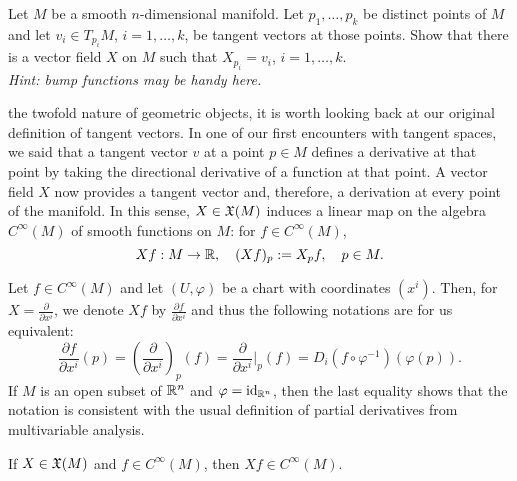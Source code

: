 \begin{exercise}
  Let $M$ be a smooth $n$-dimensional manifold.
  Let $p_1,\ldots,p_k$ be distinct points of $M$ and let $v_i\in T_{p_i}M$, $i=1,\ldots,k$, be tangent vectors at those points.
  Show that there is a vector field $X$ on $M$ such that $X_{p_i} = v_i$, $i=1,\ldots, k$.\\
  \textit{\small Hint: bump functions may be handy here.}
\end{exercise}

 the twofold nature of geometric objects, it is worth looking back at our original definition of tangent vectors.
In one of our first encounters with tangent spaces, we said that a tangent vector $v$ at a point $p\in M$ defines a derivative at that point by taking the directional derivative of a function at that point.
A vector field $X$ now provides a tangent vector and, therefore, a derivation at every point of the manifold.
In this sense, $X\in\mathfrak{X}(M)$ induces a linear map on the algebra $C^\infty(M)$ of smooth functions on $M$: for $f\in C^\infty(M)$,
\begin{equation}\label{eq:diff_directional_derivative}
  Xf : M\to\mathbb{R}, \quad
  (Xf)_p := X_p f, \quad p\in M.
\end{equation}

\begin{notation}\label{notation:derivative}
  Let $f\in C^\infty(M)$ and let $(U, \varphi)$ be a chart with coordinates $(x^i)$.
  Then, for $X = \frac{\partial}{\partial x^i}$, we denote $Xf$ by $\frac{\partial f}{\partial x^i}$ and thus the following notations are for us equivalent:
  \begin{equation}
    \frac{\partial f}{\partial x^i}(p)
    = \left(\frac{\partial}{\partial x^i}\right)_p(f)
    = \frac{\partial}{\partial x^i}\Big|_p(f)
    = D_i(f\circ\varphi^{-1})(\varphi(p)).
  \end{equation}
  If $M$ is an open subset of $\mathbb{R}^n$ and $\varphi=\operatorname{id}_{\mathbb{R}^n}$, then the last equality shows that the notation is consistent with the usual definition of partial derivatives from multivariable analysis.
\end{notation}

\begin{exercise}
  If $X\in\mathfrak{X}(M)$ and $f\in C^\infty(M)$, then $Xf\in C^\infty(M)$.
\end{exercise}

